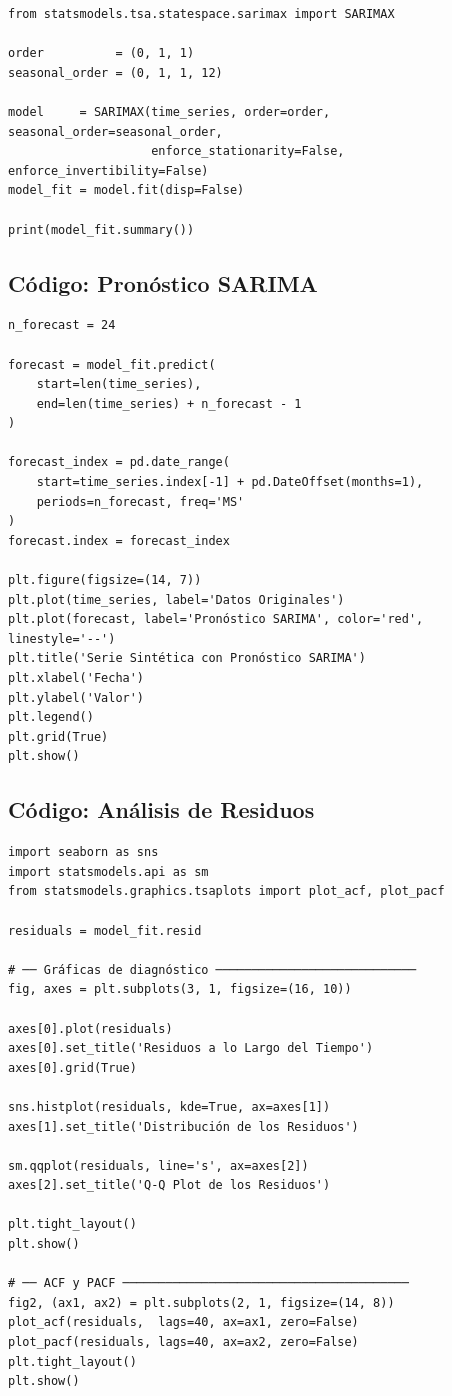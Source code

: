 \documentclass[12pt, a4paper]{article}
\begin{document}
\begin{lstlisting}[caption={Ajuste del modelo SARIMA$(0,1,1)(0,1,1)_{12}$}]
from statsmodels.tsa.statespace.sarimax import SARIMAX

order          = (0, 1, 1)
seasonal_order = (0, 1, 1, 12)

model     = SARIMAX(time_series, order=order, seasonal_order=seasonal_order,
                    enforce_stationarity=False, enforce_invertibility=False)
model_fit = model.fit(disp=False)

print(model_fit.summary())
\end{lstlisting}

\subsection{Código: Pronóstico SARIMA}

\begin{lstlisting}[caption={Pronóstico a 24 meses con SARIMA}]
n_forecast = 24

forecast = model_fit.predict(
    start=len(time_series),
    end=len(time_series) + n_forecast - 1
)

forecast_index = pd.date_range(
    start=time_series.index[-1] + pd.DateOffset(months=1),
    periods=n_forecast, freq='MS'
)
forecast.index = forecast_index

plt.figure(figsize=(14, 7))
plt.plot(time_series, label='Datos Originales')
plt.plot(forecast, label='Pronóstico SARIMA', color='red', linestyle='--')
plt.title('Serie Sintética con Pronóstico SARIMA')
plt.xlabel('Fecha')
plt.ylabel('Valor')
plt.legend()
plt.grid(True)
plt.show()
\end{lstlisting}

\subsection{Código: Análisis de Residuos}

\begin{lstlisting}[caption={Diagnóstico gráfico y estadístico de los residuos}]
import seaborn as sns
import statsmodels.api as sm
from statsmodels.graphics.tsaplots import plot_acf, plot_pacf

residuals = model_fit.resid

# ── Gráficas de diagnóstico ────────────────────────────
fig, axes = plt.subplots(3, 1, figsize=(16, 10))

axes[0].plot(residuals)
axes[0].set_title('Residuos a lo Largo del Tiempo')
axes[0].grid(True)

sns.histplot(residuals, kde=True, ax=axes[1])
axes[1].set_title('Distribución de los Residuos')

sm.qqplot(residuals, line='s', ax=axes[2])
axes[2].set_title('Q-Q Plot de los Residuos')

plt.tight_layout()
plt.show()

# ── ACF y PACF ────────────────────────────────────────
fig2, (ax1, ax2) = plt.subplots(2, 1, figsize=(14, 8))
plot_acf(residuals,  lags=40, ax=ax1, zero=False)
plot_pacf(residuals, lags=40, ax=ax2, zero=False)
plt.tight_layout()
plt.show()
\end{lstlisting}
\end{document}
